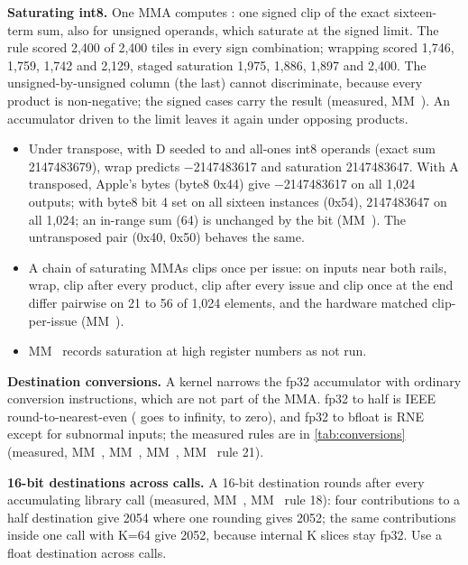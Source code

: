 \textbf{Saturating int8.} One MMA computes : one signed clip of the exact sixteen-term sum, also for
unsigned operands, which saturate at the signed limit. The rule scored 2,400 of 2,400 tiles in every sign
combination; wrapping scored 1,746, 1,759, 1,742 and 2,129, staged saturation 1,975, 1,886, 1,897 and 2,400. The
unsigned-by-unsigned column (the last) cannot discriminate, because every product is non-negative; the signed cases
carry the result (measured, MM~). An accumulator driven to the limit leaves it again under opposing products.

\begin{itemize}
\item Under transpose, with D seeded to  and all-ones int8 operands (exact sum 2147483679), wrap
  predicts −2147483617 and saturation 2147483647. With A transposed, Apple's bytes (byte8 0x44) give −2147483617 on all
  1,024 outputs; with byte8 bit 4 set on all sixteen  instances (0x54), 2147483647 on all 1,024; an in-range sum
  (64) is unchanged by the bit (MM~). The untransposed pair (0x40, 0x50) behaves the same.
\item A chain of saturating MMAs clips once per issue: on inputs near both rails, wrap, clip after every
  product, clip after every issue and clip once at the end differ pairwise on 21 to 56 of 1,024 elements, and the
  hardware matched clip-per-issue (MM~).
\item MM~ records saturation at high register numbers as not run.
\end{itemize}

\textbf{Destination conversions.} A kernel narrows the fp32 accumulator with ordinary conversion instructions, which
are not part of the MMA. fp32 to half is IEEE round-to-nearest-even ( goes to infinity,
 to zero), and fp32 to bfloat is RNE except for subnormal inputs; the measured rules are in
\cref{tab:conversions} (measured, MM~, MM~, MM~, MM~ rule 21).

\textbf{16-bit destinations across calls.} A 16-bit destination rounds after every accumulating library call
(measured, MM~, MM~ rule 18): four contributions to a half destination give 2054 where one rounding gives
2052; the same contributions inside one call with K=64 give 2052, because internal K slices stay fp32. Use a float
destination across calls.

